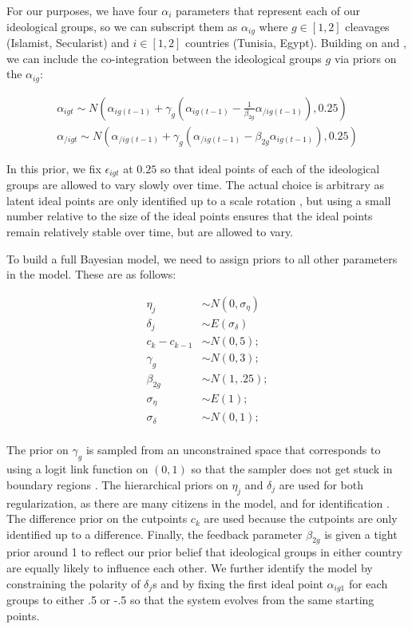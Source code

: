 \documentclass[12pt]{article}
\begin{document}
For our purposes, we have four $\alpha_i$ parameters that represent each of our ideological groups, so we can subscript them as $\alpha_{ig}$ where $g \in [1,2]$ cleavages (Islamist, Secularist) and $i \in [1,2]$ countries (Tunisia, Egypt).  Building on \textcite{quinn2002} and \textcite{kropko2013}, we can include the co-integration between the ideological groups $g$ via priors on the $\alpha_{ig}$:

\begin{align*}
\alpha_{igt}  \sim N(\alpha_{ig(t-1)} + \gamma_g (\alpha_{ig(t-1)} - \frac{1}{\beta_{2g}}  \alpha_{/ig(t-1)}),0.25)\\
\alpha_{/igt}  \sim N(\alpha_{/ig(t-1)} + \gamma_g (\alpha_{/ig(t-1)} - \beta_{2g}  \alpha_{ig(t-1)}),0.25)
\end{align*}

In this prior, we fix $\epsilon_{igt}$ at $0.25$ so that ideal points of each of the ideological groups are allowed to vary slowly over time. The actual choice is arbitrary as latent ideal points are only identified up to a scale rotation \parencite{gelman2005}, but using a small number relative to the size of the ideal points ensures that the ideal points remain relatively stable over time, but are allowed to vary.

To build a full Bayesian model, we need to assign priors to all other parameters in the model. These are as follows:

\begin{align*}
	\eta_j &\sim N(0,\sigma_{\eta})\\
	\delta_j &\sim E(\sigma_{\delta}) \\
	c_{k} - c_{k-1} &\sim N(0,5);\\
	\gamma_g &\sim N(0,3);\\
	\beta_{2g} &\sim  N(1,.25);\\
	\sigma_{\eta} &\sim E(1);\\
	\sigma_{\delta} &\sim N(0,1);\\
\end{align*}

The prior on $\gamma_g$ is sampled from an unconstrained space that corresponds to using a logit link function on $(0,1)$ so that the sampler does not get stuck in boundary regions \parencite{stan2016}. The hierarchical priors on $\eta_j$ and $\delta_j$ are used for both regularization, as there are many citizens in the model, and for identification \parencite{gelman2005}. The difference prior on the cutpoints $c_k$ are used because the cutpoints are only identified up to a difference. Finally, the feedback parameter $\beta_{2g}$ is given a tight prior around 1 to reflect our prior belief that ideological groups in either country are equally likely to influence each other. We further identify the model by constraining the polarity of $\delta_j$s and by fixing the first ideal point $\alpha_{ig1}$ for each groups to either .5 or -.5 so that the system evolves from the same starting points.
\end{document}
